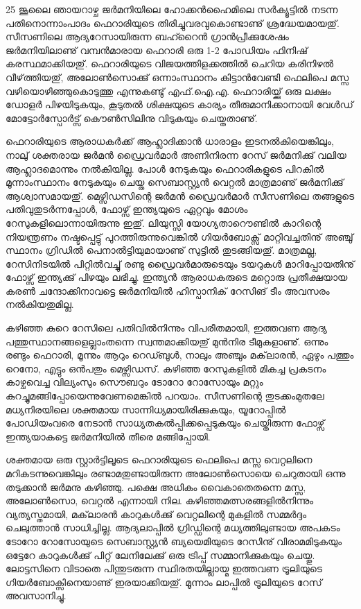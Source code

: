 ﻿
\vskip 2pt

25 ജൂലൈ ഞായറാഴ്ച ജര്‍മനിയിലെ ഹോക്കന്‍ഹൈമിലെ സര്‍ക്യൂട്ടില്‍ നടന്ന പതിനൊന്നാംപാദം ഫെറാരിയുടെ 
തിരിച്ചുവരവുകൊണ്ടാണു് ശ്രദ്ധേയമായതു്. സീസണിലെ ആദ്യറേസായിരുന്ന ബഹ്റൈന്‍ ഗ്രാന്‍പ്രീക്കുശേഷം 
ജര്‍മനിയിലാണു് വമ്പന്‍മാരായ ഫെറാരി ഒരു 1-2 പോഡിയം ഫിനിഷ് കരസ്ഥമാക്കിയതു്. ഫെറാരിയുടെ 
വിജയത്തിളക്കത്തില്‍ ചെറിയ കരിനിഴല്‍ വീഴ്‌ത്തിയതു്, അലോണ്‍സൊക്കു് ഒന്നാംസ്ഥാനം കിട്ടാന്‍വേണ്ടി ഫെലിപെ 
മസ്സ വഴിയൊഴിഞ്ഞുകൊടുത്തു എന്നുകണ്ടു് എഫ്.ഐ.എ. ഫെറാരിയ്ക്കു് ഒരു ലക്ഷം ഡോളര്‍ പിഴയിടുകയും, കൂടുതല്‍ 
ശിക്ഷയുടെ കാര്യം തീരുമാനിക്കാനായി വേള്‍ഡ് മോട്ടോര്‍സ്പോര്‍ട്സ് കൌണ്‍സിലിനു വിടുകയും ചെയ്തതാണു്.

ഫെറാരിയുടെ ആരാധകര്‍ക്ക് ആഹ്ലാദിക്കാന്‍ ധാരാളം ഇടനല്‍കിയെങ്കിലും, നാലു് ശക്തരായ ജര്‍മന്‍ ഡ്രൈവര്‍മാര്‍ 
അണിനിരന്ന റേസ് ജര്‍മനിക്കു് വലിയ ആഹ്ലാദമൊന്നും നല്‍കിയില്ല. പോള്‍ നേടുകയും ഫെറാരികളുടെ പിറകില്‍ 
മൂന്നാംസ്ഥാനം നേടുകയും ചെയ്ത സെബാസ്റ്റ്യന്‍ വെറ്റല്‍ മാത്രമാണു് ജര്‍മനിക്കു് ആശ്വാസമായതു്. മെഴ്സിഡസിന്റെ 
ജര്‍മന്‍ ഡ്രൈവര്‍മാര്‍ സീസണിലെ തങ്ങളുടെ പതിവുതുടര്‍ന്നപ്പോള്‍, ഫോഴ്സ് ഇന്ത്യയുടെ ഏറ്റവും മോശം 
റേസുകളിലൊന്നായിരുന്നു ഇതു്. ലിയുസ്സി യോഗ്യതാറൌണ്ടില്‍ കാറിന്റെ നിയന്ത്രണം നഷ്ടപ്പെട്ടു് പുറത്തിരുന്നുവെങ്കില്‍ 
ഗിയര്‍ബോക്സ് മാറ്റിവച്ചതിനു് അഞ്ചു് സ്ഥാനം ഗ്രിഡില്‍ പെനാല്‍ട്ടിയുമായാണു് സുട്ടില്‍ തുടങ്ങിയതു്. മാത്രമല്ല, 
റേസിനിടയില്‍ പിറ്റില്‍വച്ചു് രണ്ടു ഡ്രൈവര്‍മാരുടെയും ടയറുകള്‍ മാറിപ്പോയതിനു് ഫോഴ്സ് ഇന്ത്യക്കു് പിഴയും ലഭിച്ചു. 
ഇന്ത്യന്‍ ആരാധകരുടെ മറ്റൊരു പ്രതീക്ഷയായ കരണ്‍ ചന്ദോക്കിനാവട്ടെ ജര്‍മനിയില്‍ ഹിസ്പാനിക് റേസിങ് ടീം 
അവസരം നല്‍കിയതുമില്ല.

കഴിഞ്ഞ കുറെ റേസിലെ പതിവില്‍നിന്നും വിപരീതമായി, ഇത്തവണ ആദ്യ പത്തുസ്ഥാനങ്ങളെല്ലാംതന്നെ 
സ്വന്തമാക്കിയതു് മുന്‍നിര ടീമുകളാണു്. ഒന്നും രണ്ടും ഫെറാരി, മൂന്നും ആറും റെഡ്ബുള്‍, നാലും അഞ്ചും മക്‌ലാരന്‍, ഏഴും 
പത്തും റെനോ, എട്ടും ഒന്‍പതും മെഴ്സിഡസ്. കഴിഞ്ഞ റേസുകളില്‍ മികച്ച പ്രകടനം കാഴ്ചവെച്ച വില്യംസും സൌബറും 
ടോറോ റോസോയും മറ്റും കുറച്ചുമങ്ങിപ്പോയെന്നുവേണമെങ്കില്‍ പറയാം. സീസണിന്റെ തുടക്കംമുതലേ മധ്യനിരയിലെ 
ശക്തമായ സാന്നിധ്യമായിരിക്കുകയും, യൂറോപ്പില്‍ പോഡിയംവരെ നേടാന്‍ സാധ്യതകല്‍പ്പിക്കപ്പെടുകയും ചെയ്തിരുന്ന 
ഫോഴ്സ് ഇന്ത്യയാകട്ടെ ജര്‍മനിയില്‍ തീരെ മങ്ങിപ്പോയി.

ശക്തമായ ഒരു സ്റ്റാര്‍ട്ടിലൂടെ ഫെറാരിയുടെ ഫെലിപെ മസ്സ വെറ്റലിനെ മറികടന്നുവെങ്കിലും രണ്ടാമതുണ്ടായിരുന്ന 
അലോണ്‍സൊയെ ചെറുതായി ഒന്നു തടുക്കാന്‍ ജര്‍മനു കഴിഞ്ഞു. പക്ഷെ അധികം വൈകാതെതന്നെ മസ്സ, 
അലോണ്‍സൊ, വെറ്റല്‍ എന്നായി നില. കഴിഞ്ഞമത്സരങ്ങളില്‍നിന്നും വ്യത്യസ്തമായി, മക്‌ലാരന്‍ കാറുകള്‍ക്കു് വെറ്റലിന്റെ 
മുകളില്‍ സമ്മര്‍ദ്ദം ചെലുത്താന്‍ സാധിച്ചില്ല. ആദ്യലാപ്പില്‍ ഗ്രിഡ്ഡിന്റെ മധ്യത്തിലുണ്ടായ അപകടം ടോറോ റോസോയുടെ 
സെബാസ്റ്റ്യന്‍ ബ്യയെമിയുടെ റേസിനു് വിരാമമിടുകയും ഒട്ടേറേ കാറുകള്‍ക്കു് പിറ്റ് ലേനിലേക്കു് ഒരു ട്രിപ്പ് സമ്മാനിക്കുകയും 
ചെയ്തു. ലോട്ടസിനെ വിടാതെ പിന്തുടരുന്ന സ്ഥിരതയില്ലായ്മ ഇത്തവണ ട്രൂലിയുടെ ഗിയര്‍ബോക്സിനെയാണു് ഇരയാക്കിയതു്. 
മൂന്നാം ലാപ്പില്‍ ട്രൂലിയുടെ റേസ് അവസാനിച്ചു.

